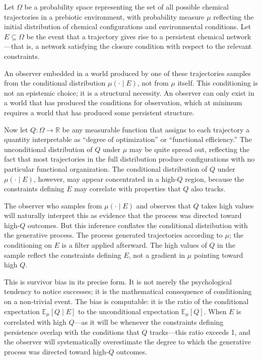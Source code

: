 \documentclass[12pt, a4paper, oneside]{article}
\theoremstyle{plain}
\theoremstyle{definition}
\theoremstyle{remark}
\begin{document}
Let $\Omega$ be a probability space representing the set of all possible chemical trajectories in a prebiotic environment, with probability measure $\mu$ reflecting the initial distribution of chemical configurations and environmental conditions. Let $E \subseteq \Omega$ be the event that a trajectory gives rise to a persistent chemical network---that is, a network satisfying the closure condition with respect to the relevant constraints.

An observer embedded in a world produced by one of these trajectories samples from the conditional distribution $\mu(\cdot \mid E)$, not from $\mu$ itself. This conditioning is not an epistemic choice; it is a structural necessity. An observer can only exist in a world that has produced the conditions for observation, which at minimum requires a world that has produced some persistent structure.

Now let $Q : \Omega \to \mathbb{R}$ be any measurable function that assigns to each trajectory a quantity interpretable as ``degree of optimization'' or ``functional efficiency.'' The unconditional distribution of $Q$ under $\mu$ may be quite spread out, reflecting the fact that most trajectories in the full distribution produce configurations with no particular functional organization. The conditional distribution of $Q$ under $\mu(\cdot \mid E)$, however, may appear concentrated in a high-$Q$ region, because the constraints defining $E$ may correlate with properties that $Q$ also tracks.

The observer who samples from $\mu(\cdot \mid E)$ and observes that $Q$ takes high values will naturally interpret this as evidence that the process was directed toward high-$Q$ outcomes. But this inference conflates the conditional distribution with the generative process. The process generated trajectories according to $\mu$; the conditioning on $E$ is a filter applied afterward. The high values of $Q$ in the sample reflect the constraints defining $E$, not a gradient in $\mu$ pointing toward high $Q$.

This is survivor bias in its precise form. It is not merely the psychological tendency to notice successes; it is the mathematical consequence of conditioning on a non-trivial event. The bias is computable: it is the ratio of the conditional expectation $\mathbb{E}_\mu[Q \mid E]$ to the unconditional expectation $\mathbb{E}_\mu[Q]$. When $E$ is correlated with high $Q$---as it will be whenever the constraints defining persistence overlap with the conditions that $Q$ tracks---this ratio exceeds 1, and the observer will systematically overestimate the degree to which the generative process was directed toward high-$Q$ outcomes.
\end{document}
